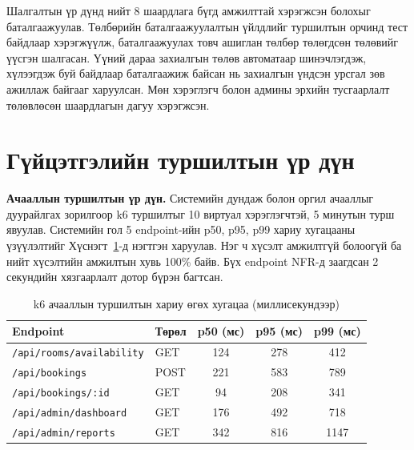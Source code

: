 Шалгалтын үр дүнд нийт 8 шаардлага бүгд амжилттай хэрэгжсэн болохыг баталгаажуулав. Төлбөрийн баталгаажуулалтын үйлдлийг туршилтын орчинд тест байдлаар хэрэгжүүлж, баталгаажуулах товч ашиглан төлбөр төлөгдсөн төлөвийг үүсгэн шалгасан. Үүний дараа захиалгын төлөв автоматаар шинэчлэгдэж, хүлээгдэж буй байдлаар баталгаажиж байсан нь захиалгын үндсэн урсгал зөв ажиллаж байгааг харуулсан. Мөн хэрэглэгч болон админы эрхийн тусгаарлалт төлөвлөсөн шаардлагын дагуу хэрэгжсэн.
\section{Гүйцэтгэлийн туршилтын үр дүн}

\textbf{Ачааллын туршилтын үр дүн.} Системийн дундаж болон оргил ачааллыг дуурайлгах зорилгоор k6 туршилтыг 10 виртуал хэрэглэгчтэй, 5 минутын турш явуулав. Системийн гол 5 endpoint-ийн p50, p95, p99 хариу хугацааны үзүүлэлтийг Хүснэгт~\ref{tab:k6-results}-д нэгтгэн харуулав. Нэг ч хүсэлт амжилтгүй болоогүй ба нийт хүсэлтийн амжилтын хувь 100\% байв. Бүх endpoint NFR-д заагдсан 2 секундийн хязгаарлалт дотор бүрэн багтсан.

\begin{table}[H]
  \centering
  \caption{k6 ачааллын туршилтын хариу өгөх хугацаа (миллисекундээр)}
  \label{tab:k6-results}
  \begin{tabular}{llccc}
    \toprule
    \textbf{Endpoint} & \textbf{Төрөл} & \textbf{p50 (мс)} & \textbf{p95 (мс)} & \textbf{p99 (мс)} \\
    \midrule
    \texttt{/api/rooms/availability} & GET  & 124 & 278  & 412  \\
    \texttt{/api/bookings}           & POST & 221 & 583  & 789  \\
    \texttt{/api/bookings/:id}       & GET  & 94  & 208  & 341  \\
    \texttt{/api/admin/dashboard}    & GET  & 176 & 492  & 718  \\
    \texttt{/api/admin/reports}      & GET  & 342 & 816  & 1147 \\
    \bottomrule
  \end{tabular}
\end{table}

